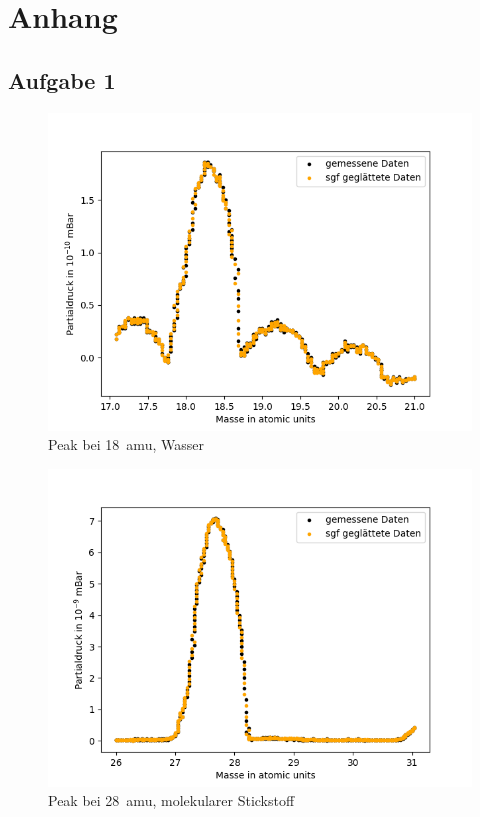 \chapter{Anhang}
\section{Aufgabe 1}
\begin{figure}
    \centering
    \includegraphics[width=140mm,scale=0.8]{Massenspektrometer/include/MSm18Wasser.png}
    \caption{Peak bei \SI{18}{amu}, Wasser}
    \label{fig:MSWasserPeak}
\end{figure}
\begin{figure}
    \centering
    \includegraphics[width=140mm,scale=0.8]{Massenspektrometer/include/MSm28N2.png}
    \caption{Peak bei \SI{28}{amu}, molekularer Stickstoff}
    \label{fig:MSN2Peak}
\end{figure}

